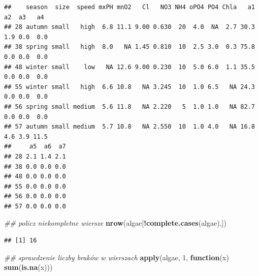 \documentclass[
]{book}
\newenvironment{Shaded}{\begin{snugshade}}{\end{snugshade}}
\newcommand{\CommentTok}[1]{\textcolor[rgb]{0.56,0.35,0.01}{\textit{#1}}}
\newcommand{\ControlFlowTok}[1]{\textcolor[rgb]{0.13,0.29,0.53}{\textbf{#1}}}
\newcommand{\DecValTok}[1]{\textcolor[rgb]{0.00,0.00,0.81}{#1}}
\newcommand{\KeywordTok}[1]{\textcolor[rgb]{0.13,0.29,0.53}{\textbf{#1}}}
\newcommand{\NormalTok}[1]{#1}
\newcommand{\OperatorTok}[1]{\textcolor[rgb]{0.81,0.36,0.00}{\textbf{#1}}}
\newcommand{\StringTok}[1]{\textcolor[rgb]{0.31,0.60,0.02}{#1}}
\theoremstyle{plain}
\theoremstyle{definition}
\theoremstyle{definition}
\theoremstyle{definition}
\theoremstyle{definition}
\theoremstyle{remark}
\begin{document}
\begin{Shaded}
\end{Shaded}

\begin{verbatim}
##    season  size  speed mxPH mnO2   Cl   NO3 NH4 oPO4 PO4 Chla   a1  a2  a3   a4
## 28 autumn small   high  6.8 11.1 9.00 0.630  20  4.0  NA  2.7 30.3 1.9 0.0  0.0
## 38 spring small   high  8.0   NA 1.45 0.810  10  2.5 3.0  0.3 75.8 0.0 0.0  0.0
## 48 winter small    low   NA 12.6 9.00 0.230  10  5.0 6.0  1.1 35.5 0.0 0.0  0.0
## 55 winter small   high  6.6 10.8   NA 3.245  10  1.0 6.5   NA 24.3 0.0 0.0  0.0
## 56 spring small medium  5.6 11.8   NA 2.220   5  1.0 1.0   NA 82.7 0.0 0.0  0.0
## 57 autumn small medium  5.7 10.8   NA 2.550  10  1.0 4.0   NA 16.8 4.6 3.9 11.5
##     a5  a6  a7
## 28 2.1 1.4 2.1
## 38 0.0 0.0 0.0
## 48 0.0 0.0 0.0
## 55 0.0 0.0 0.0
## 56 0.0 0.0 0.0
## 57 0.0 0.0 0.0
\end{verbatim}

\begin{Shaded}
\begin{Highlighting}[]
\CommentTok{## policz niekompletne wiersze}
\KeywordTok{nrow}\NormalTok{(algae[}\OperatorTok{!}\KeywordTok{complete.cases}\NormalTok{(algae),])}
\end{Highlighting}
\end{Shaded}

\begin{verbatim}
## [1] 16
\end{verbatim}

\begin{Shaded}
\begin{Highlighting}[]
\CommentTok{## sprawdzenie liczby braków w wierszach}
\KeywordTok{apply}\NormalTok{(algae, }\DecValTok{1}\NormalTok{, }\ControlFlowTok{function}\NormalTok{(x) }\KeywordTok{sum}\NormalTok{(}\KeywordTok{is.na}\NormalTok{(x)))}
\end{Highlighting}
\end{Shaded}
\end{document}
